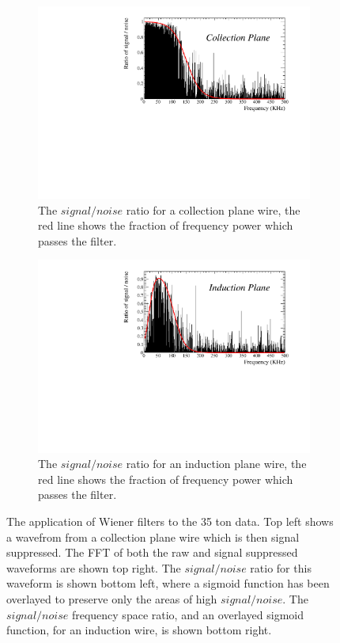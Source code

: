 \begin{figure}[h!]
\begin{subfigure}{0.48\textwidth}
    \centering
    \includegraphics[width=\textwidth]{Collection}
    \caption{The $signal/noise$ ratio for a collection plane wire, the red line shows the fraction of frequency power which passes the filter.}
    \label{fig:FreqCollection}
  \end{subfigure}%
  \hspace{0.03\textwidth}%
  \begin{subfigure}{0.48\textwidth}
    \centering
    \includegraphics[width=\textwidth]{Induction}
    \caption{The $signal/noise$ ratio for an induction plane wire, the red line shows the fraction of frequency power which passes the filter.}
    \label{fig:FreqInduction}
  \end{subfigure}
  \caption[Applying Wiener filters to the 35 ton data]
          {The application of Wiener filters to the 35 ton data. Top left shows a wavefrom from a collection plane wire which is then signal suppressed. The FFT of both the raw and signal suppressed waveforms are shown top right. The $signal/noise$ ratio for this waveform is shown bottom left, where a sigmoid function has been overlayed to preserve only the areas of high $signal/noise$. The $signal/noise$ frequency space ratio, and an overlayed sigmoid function, for an induction wire, is shown bottom right.}
  \label{fig:FrequencyFilter}
\end{figure}

